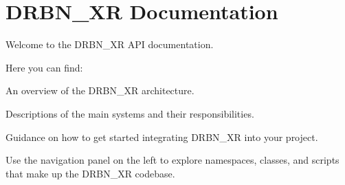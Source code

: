 \chapter{DRBN\+\_\+\+XR Documentation }
\hypertarget{index}{}\label{index}
Welcome to the DRBN\+\_\+\+XR API documentation.

Here you can find:\+
\begin{DoxyItemize}
\item An overview of the DRBN\+\_\+\+XR architecture.
\item Descriptions of the main systems and their responsibilities.
\item Guidance on how to get started integrating DRBN\+\_\+\+XR into your project.
\end{DoxyItemize}

Use the navigation panel on the left to explore namespaces, classes, and scripts that make up the DRBN\+\_\+\+XR codebase. 